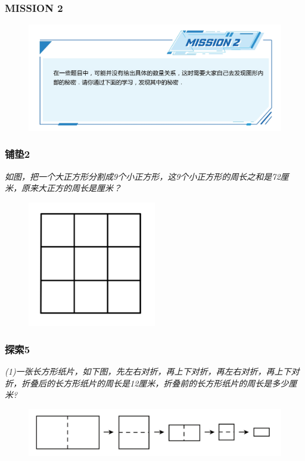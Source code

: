 \begin{frame}
    \frametitle{MISSION 2}
    \begin{figure}[H] 
        \centering
        \includegraphics[width=1\textwidth]{./pics/Chapter_1/mission2.png}
    \end{figure}
\end{frame}

\begin{frame}
    \frametitle{铺垫2}
    \textit{如图，把一个大正方形分割成9个小正方形，这9个小正方形的周长之和是72厘米，原来大正方的周长是厘米？}
    \begin{figure}[H] 
        \centering
        \includegraphics[width=0.5\textwidth]{./pics/Chapter_1/pudian2.png}
    \end{figure}
\end{frame}

\begin{frame}
    \frametitle{探索5}
    \textit{(1)一张长方形纸片，如下图，先左右对折，再上下对折，再左右对折，再上下对折，折叠后的长方形纸片的周长是12厘米，折叠前的长方形纸片的周长是多少厘米?}
    \begin{figure}[H] 
        \centering
        \includegraphics[width=1\textwidth]{./pics/Chapter_1/tansuo5.png}
    \end{figure}
\end{frame}


